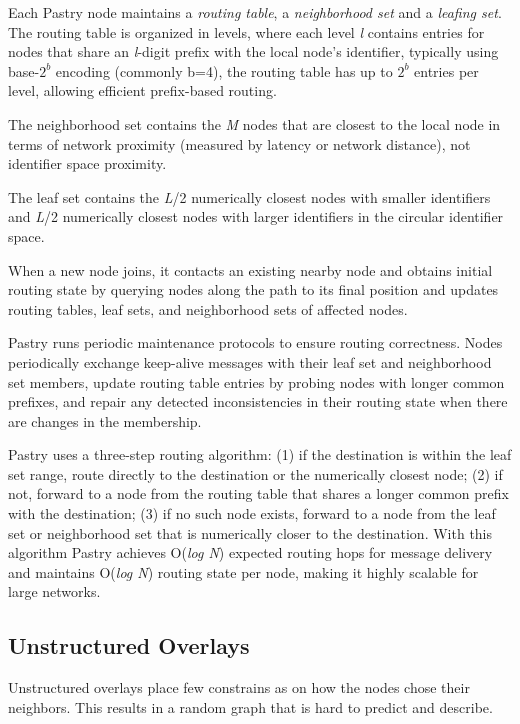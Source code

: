 Each Pastry node maintains a \textit{routing table}, a \textit{neighborhood set}
and a \textit{leafing set}. The routing table is organized in levels, where each level
\textit{l} contains entries for nodes that share an \textit{l}-digit prefix with the local
node's identifier, typically using base-$2^b$ encoding (commonly b=4), the routing
table has up to $2^b$ entries per level, allowing efficient prefix-based routing.

The neighborhood set contains the \textit{M} nodes that are closest to the local node in
terms of network proximity (measured by latency or network distance), not identifier space proximity.

The leaf set contains the \textit{L}/2 numerically closest nodes with smaller identifiers and \textit{L}/2
numerically closest nodes with larger identifiers in the circular identifier space.

When a new node joins, it contacts an existing nearby node and obtains initial routing state by querying
nodes along the path to its final position and updates routing tables, leaf sets,
and neighborhood sets of affected nodes. 

Pastry runs periodic maintenance protocols to ensure routing correctness. Nodes periodically exchange
keep-alive messages with their leaf set and neighborhood set members, update routing table entries by probing
nodes with longer common prefixes, and repair any detected inconsistencies in their routing state when there are changes
in the membership.

Pastry uses a three-step routing algorithm: (1) if the destination is within the leaf set range,
route directly to the destination or the numerically closest node; (2) if not, forward to a node from
the routing table that shares a longer common prefix with the destination; (3) if no such node exists,
forward to a node from the leaf set or neighborhood set that is numerically closer to the destination.
With this algorithm Pastry achieves O(\textit{log N}) expected routing hops for message delivery and maintains
O(\textit{log N}) routing state per node, making it highly scalable for large networks.


\subsection{Unstructured Overlays}\label{sub:unstructured_overlays}

Unstructured overlays place few constrains as on how the nodes chose their
neighbors. This results in a random graph that is hard to predict and describe.

